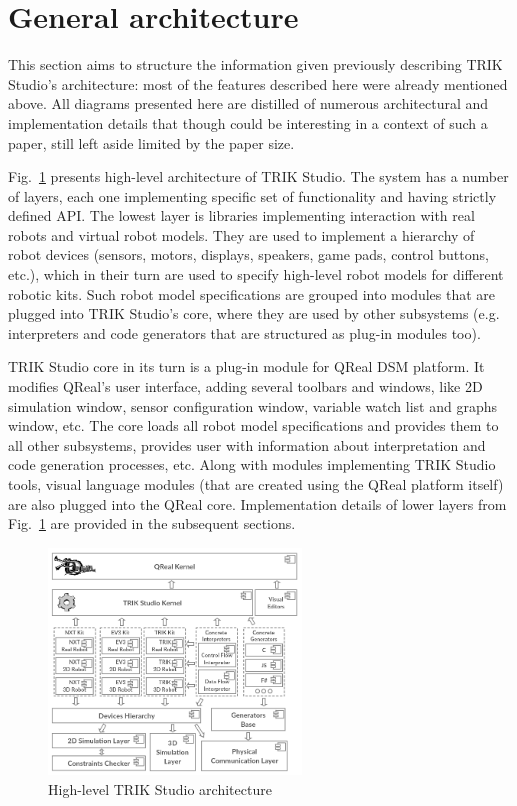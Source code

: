 \documentclass[conference]{IEEEtran}
\begin{document}
\section{General architecture}
\label{chapter:commonArchitecture}

This section aims to structure the information given previously describing TRIK Studio's architecture: most of the features described here were already mentioned above. All diagrams presented here are distilled of numerous architectural and implementation details that though could be interesting in a context of such a paper, still left aside limited by the paper size.

Fig.~\ref{image:commonTSArch} presents high-level architecture of TRIK Studio. The system has a number of layers, each one implementing specific set of functionality and having strictly defined API. The lowest layer is libraries implementing interaction with real robots and virtual robot models. They are used to implement a hierarchy of robot devices (sensors, motors, displays, speakers, game pads, control buttons, etc.), which in their turn are used to specify high-level robot models for different robotic kits. Such robot model specifications are grouped into modules that are plugged into TRIK Studio's core, where they are used by other subsystems (e.g. interpreters and code generators that are structured as plug-in modules too).

TRIK Studio core in its turn is a plug-in module for QReal DSM platform. It modifies QReal's user interface, adding several toolbars and windows, like 2D simulation window, sensor configuration window, variable watch list and graphs window, etc. The core loads all robot model specifications and provides them to all other subsystems, provides user with information about interpretation and code generation processes, etc. Along with modules implementing TRIK Studio tools, visual language modules (that are created using the QReal platform itself) are also plugged into the QReal core. Implementation details of lower layers from Fig.~\ref{image:commonTSArch} are provided in the subsequent sections.

\begin{figure}[ht]
    \includegraphics[width=0.6\textwidth]{TS_Common_Architecture.png}
    \caption{High-level TRIK Studio architecture}
    \label{image:commonTSArch}
\end{figure}
\end{document}

